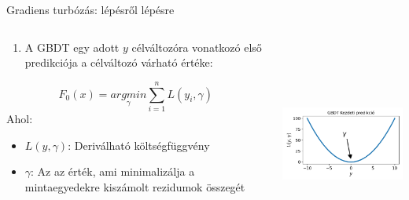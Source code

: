 \documentclass[english, aspectratio=169]{beamer}
\begin{document}
\begin{frame}{Gradiens turbózás: lépésről lépésre}
\begin{columns}
\begin{column}{.5\textwidth}
\begin{enumerate}
	\item A GBDT egy adott $y$ célváltozóra vonatkozó első predikciója a célváltozó várható értéke:
\end{enumerate}
\begin{block}{}
\[
F_0\left(x\right) = \underset{\gamma}{argmin} \sum_{i=1}^n L\left(y_i, \gamma\right)
\]
Ahol:
\begin{itemize}
	\item $L\left(y, \gamma \right)$: Deriválható költségfüggvény
	\item $\gamma$: Az az érték, ami minimalizálja a mintaegyedekre kiszámolt rezidumok összegét
\end{itemize}
\end{block}
\end{column}
\begin{column}{.5\textwidth}
\begin{center}
\includegraphics[width=7cm, height=7cm, keepaspectratio]{images/ensemble_10.png}
\end{center}
\end{column}
\end{columns}
\end{frame}
\end{document}
